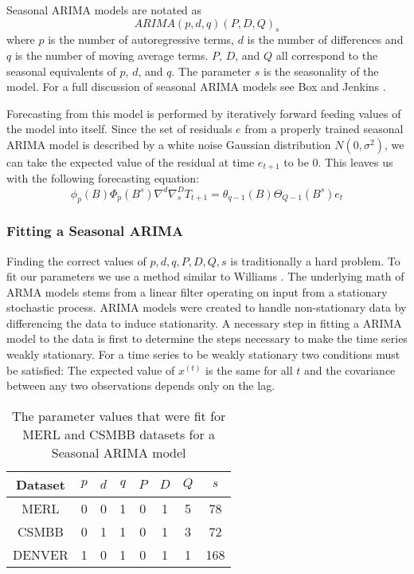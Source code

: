 Seasonal ARIMA models are notated as
\begin{equation}
ARIMA(p,d,q)(P,D,Q)_{s}
\end{equation}
where $p$ is the number of autoregressive terms, $d$ is the number of differences and $q$ is the number of moving average terms.  $P$, $D$, and $Q$ all correspond to the seasonal equivalents of $p$, $d$, and $q$.  The parameter $s$ is the seasonality of the model.  For a full discussion of seasonal ARIMA models see Box and Jenkins \cite{Box2008}.

Forecasting from this model is performed by iteratively forward feeding values of the model into itself.  Since the set of residuals $e$ from a properly trained seasonal ARIMA model is described by a white noise Gaussian distribution $N(0, \sigma^{2})$, we can take the expected value of the residual at time $e_{t + 1}$ to be 0.  This leaves us with the following forecasting equation: 
\begin{equation}
\label{eq:sarima}
\phi_{p}(B)\Phi_{p}(B^{s})\nabla^{d}\nabla^{D}_{s}T_{t + 1} = \theta_{q - 1}(B)\Theta_{Q - 1}(B^{s})e_{t}
\end{equation}


\subsubsection{Fitting a Seasonal ARIMA}

Finding the correct values of $p, d, q, P, D, Q, s$ is traditionally a hard problem.  To fit our parameters we use a method similar to Williams \cite{Williams2003}.  The underlying math of ARMA models stems from a linear filter operating on input from a stationary stochastic process.  ARIMA models were created to handle non-stationary data by differencing the data to induce stationarity.  A necessary step in fitting a ARIMA model to the data is first to determine the steps necessary to make the time series weakly stationary.  For a time series to be weakly stationary two conditions must be satisfied: The expected value of $x^{(t)}$ is the same for all $t$ and the covariance between any two observations depends only on the lag.  

\begin{table}[t]
\centering
\caption{The parameter values that were fit for MERL and CSMBB datasets for a Seasonal ARIMA model}
\begin{tabular}{|c|c|c|c|c|c|c|c|} \hline
Dataset & $p$ & $d$ & $q$ & $P$ & $D$ & $Q$ & $s$\\ \hline
MERL & 0 & 0 & 1 & 0 & 1 & 5 & 78\\ \hline
CSMBB & 0 & 1 & 1 & 0 & 1 & 3 & 72\\ \hline
DENVER & 1 & 0 & 1 & 0 & 1 & 1 & 168\\ \hline
\end{tabular}
\label{fig:sarimatab}
\end{table}


